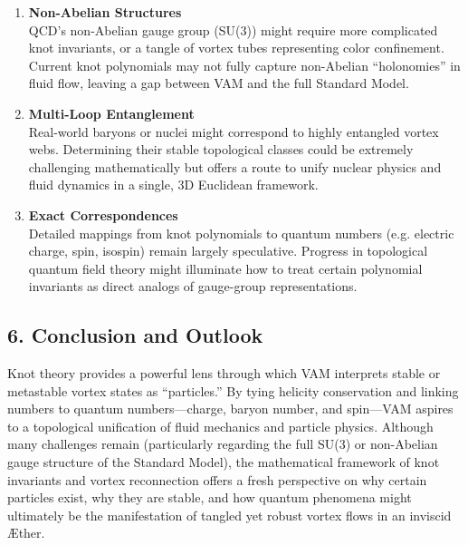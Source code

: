 \begin{enumerate}
    \item \textbf{Non-Abelian Structures} \\
    QCD’s non-Abelian gauge group (SU(3)) might require more complicated knot invariants, or a tangle of vortex tubes representing color confinement. Current knot polynomials may not fully capture non-Abelian “holonomies” in fluid flow, leaving a gap between VAM and the full Standard Model.
    \item \textbf{Multi-Loop Entanglement} \\
    Real-world baryons or nuclei might correspond to highly entangled vortex webs. Determining their stable topological classes could be extremely challenging mathematically but offers a route to unify nuclear physics and fluid dynamics in a single, 3D Euclidean framework.
    \item \textbf{Exact Correspondences} \\
    Detailed mappings from knot polynomials to quantum numbers (e.g. electric charge, spin, isospin) remain largely speculative. Progress in topological quantum field theory might illuminate how to treat certain polynomial invariants as direct analogs of gauge-group representations.
\end{enumerate}

\subsection*{6. Conclusion and Outlook}

Knot theory provides a powerful lens through which VAM interprets stable or metastable vortex states as “particles.” By tying helicity conservation and linking numbers to quantum numbers—charge, baryon number, and spin—VAM aspires to a topological unification of fluid mechanics and particle physics. Although many challenges remain (particularly regarding the full SU(3) or non-Abelian gauge structure of the Standard Model), the mathematical framework of knot invariants and vortex reconnection offers a fresh perspective on why certain particles exist, why they are stable, and how quantum phenomena might ultimately be the manifestation of tangled yet robust vortex flows in an inviscid Æther.
